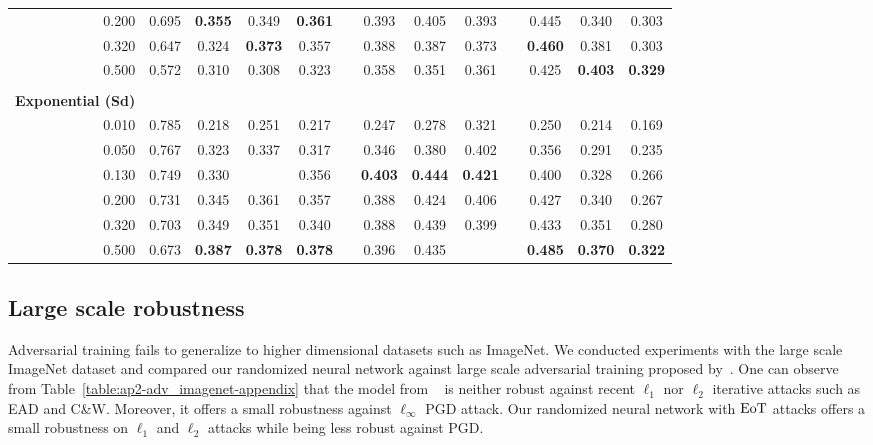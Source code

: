 \begin{table}[htbp]
\begin{tabular}{rcccccccccccc}
    0.200 & 0.695 & \textbf{0.355} & 0.349 & \textbf{0.361} &       & 0.393 & 0.405 & 0.393 &       & 0.445 & 0.340 & 0.303 \\
    0.320 & 0.647 & 0.324 & \textbf{0.373} & 0.357 &       & 0.388 & 0.387 & 0.373 &       & \textbf{0.460} & 0.381 & 0.303 \\
    0.500 & 0.572 & 0.310 & 0.308 & 0.323 &       & 0.358 & 0.351 & 0.361 &       & 0.425 & \textbf{0.403} & \textbf{0.329} \\
          &       &       &       &       &       &       &       &       &       &       &       &  \\
    \textbf{Exponential (Sd)} &       &       &       &       &       &       &       &       &       &       &       &  \\
    \midrule
    0.010 & 0.785 & 0.218 & 0.251 & 0.217 &       & 0.247 & 0.278 & 0.321 &       & 0.250 & 0.214 & 0.169 \\
    0.050 & 0.767 & 0.323 & 0.337 & 0.317 &       & 0.346 & 0.380 & 0.402 &       & 0.356 & 0.291 & 0.235 \\
    0.130 & 0.749 & 0.330 &       & 0.356 &       & \textbf{0.403} & \textbf{0.444} & \textbf{0.421} &       & 0.400 & 0.328 & 0.266 \\
    0.200 & 0.731 & 0.345 & 0.361 & 0.357 &       & 0.388 & 0.424 & 0.406 &       & 0.427 & 0.340 & 0.267 \\
    0.320 & 0.703 & 0.349 & 0.351 & 0.340 &       & 0.388 & 0.439 & 0.399 &       & 0.433 & 0.351 & 0.280 \\
    0.500 & 0.673 & \textbf{0.387} & \textbf{0.378} & \textbf{0.378} &       & 0.396 & 0.435 &       &       & \textbf{0.485} & \textbf{0.370} & \textbf{0.322} \\
    \bottomrule
    \end{tabular}%
\end{table}%

\subsection{Large scale robustness}

Adversarial training fails to generalize to higher dimensional datasets such as ImageNet.
We conducted experiments with the large scale ImageNet dataset and compared our randomized neural network against large scale adversarial training proposed by~\citet{kurakin2016adversarial}.
One can observe from Table~\ref{table:ap2-adv_imagenet-appendix} that the model from ~\citet{kurakin2016adversarial} is neither robust against recent $\ell_1$ nor $\ell_2$ iterative attacks such as EAD and C\&W.
Moreover, it offers a small robustness against $\ell_\infty$ PGD attack.
Our randomized neural network with $\operatorname*{EoT}$ attacks offers a small robustness on $\ell_1$ and $\ell_2$ attacks while being less robust against PGD. 


